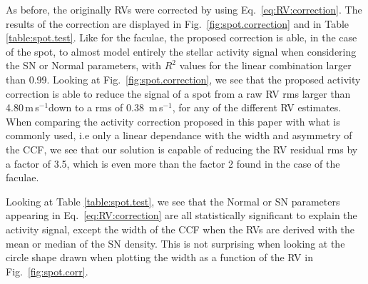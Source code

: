 \documentclass{aa}
\def\ms{\hbox{\,m\,s$^{-1}$}}         %
\begin{document}
As before, the originally RVs were corrected by using Eq.~\ref{eq:RV:correction}. The results of the correction are displayed in Fig.~\ref{fig:spot.correction} and in Table \ref{table:spot.test}. 
Like for the faculae, the proposed correction is able, in the case of the spot, to almost model entirely the stellar activity signal when considering the SN or Normal parameters, with $R^2$ values for the linear combination larger than 0.99. 
Looking at Fig.~\ref{fig:spot.correction}, we see that the proposed activity correction is able to reduce the signal of a spot from a raw RV rms larger than 4.80\ms down to a rms of 0.38 \ms, for any of the different RV estimates.
When comparing the activity correction proposed in this paper with what is commonly used, i.e only a linear dependance with the width and asymmetry of the CCF, we see that our solution is capable of reducing the RV residual rms by a factor of 3.5, which is even more than the factor 2 found in the case of the faculae.

Looking at Table \ref{table:spot.test}, we see that the Normal or SN parameters appearing in Eq.~\ref{eq:RV:correction} are all statistically significant to explain the activity signal, except the width of the CCF when the RVs are derived with the mean or median of the SN density.
This is not surprising when looking at the circle shape drawn when plotting the width as a function of the RV in Fig.~\ref{fig:spot.corr}. 
\end{document}
